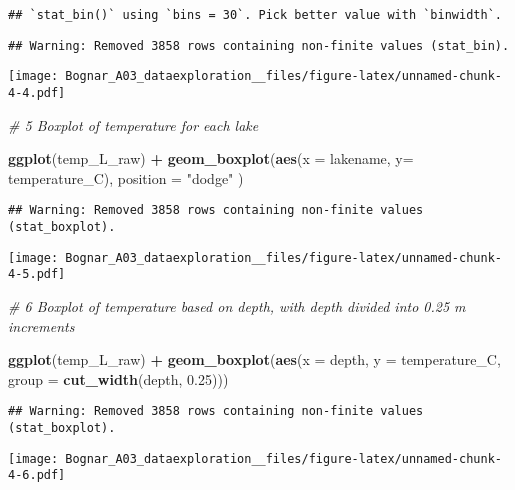 \documentclass[]{article}
\newenvironment{Shaded}{\begin{snugshade}}{\end{snugshade}}
\newcommand{\KeywordTok}[1]{\textcolor[rgb]{0.13,0.29,0.53}{\textbf{#1}}}
\newcommand{\DataTypeTok}[1]{\textcolor[rgb]{0.13,0.29,0.53}{#1}}
\newcommand{\FloatTok}[1]{\textcolor[rgb]{0.00,0.00,0.81}{#1}}
\newcommand{\StringTok}[1]{\textcolor[rgb]{0.31,0.60,0.02}{#1}}
\newcommand{\CommentTok}[1]{\textcolor[rgb]{0.56,0.35,0.01}{\textit{#1}}}
\newcommand{\OperatorTok}[1]{\textcolor[rgb]{0.81,0.36,0.00}{\textbf{#1}}}
\newcommand{\NormalTok}[1]{#1}
\begin{document}
\begin{verbatim}
## `stat_bin()` using `bins = 30`. Pick better value with `binwidth`.
\end{verbatim}

\begin{verbatim}
## Warning: Removed 3858 rows containing non-finite values (stat_bin).
\end{verbatim}

\texttt{[image: Bognar\_A03\_dataexploration\_\_files/figure-latex/unnamed-chunk-4-4.pdf]}

\begin{Shaded}
\begin{Highlighting}[]
\CommentTok{# 5 Boxplot of temperature for each lake}

\KeywordTok{ggplot}\NormalTok{(temp_L_raw) }\OperatorTok{+}
\StringTok{   }\KeywordTok{geom_boxplot}\NormalTok{(}\KeywordTok{aes}\NormalTok{(}\DataTypeTok{x =}\NormalTok{ lakename, }\DataTypeTok{y=}\NormalTok{ temperature_C), }\DataTypeTok{position =} \StringTok{"dodge"}\NormalTok{ )}
\end{Highlighting}
\end{Shaded}

\begin{verbatim}
## Warning: Removed 3858 rows containing non-finite values (stat_boxplot).
\end{verbatim}

\texttt{[image: Bognar\_A03\_dataexploration\_\_files/figure-latex/unnamed-chunk-4-5.pdf]}

\begin{Shaded}
\begin{Highlighting}[]
\CommentTok{# 6 Boxplot of temperature based on depth, with depth divided into 0.25 m increments}

\KeywordTok{ggplot}\NormalTok{(temp_L_raw) }\OperatorTok{+}
\StringTok{   }\KeywordTok{geom_boxplot}\NormalTok{(}\KeywordTok{aes}\NormalTok{(}\DataTypeTok{x =}\NormalTok{ depth, }\DataTypeTok{y =}\NormalTok{ temperature_C, }\DataTypeTok{group =} \KeywordTok{cut_width}\NormalTok{(depth, }\FloatTok{0.25}\NormalTok{)))}
\end{Highlighting}
\end{Shaded}

\begin{verbatim}
## Warning: Removed 3858 rows containing non-finite values (stat_boxplot).
\end{verbatim}

\texttt{[image: Bognar\_A03\_dataexploration\_\_files/figure-latex/unnamed-chunk-4-6.pdf]}
\end{document}
